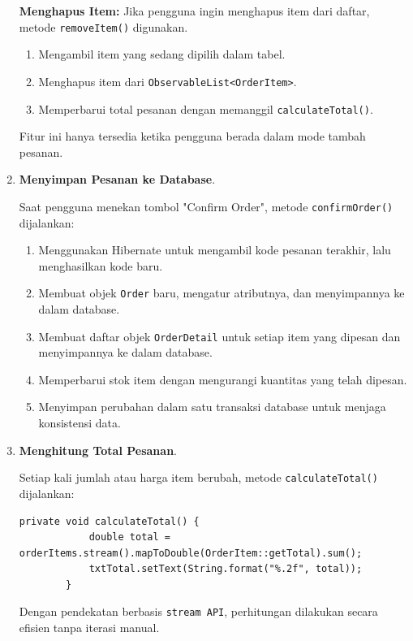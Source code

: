 \begin{enumerate}
	\textbf{Menghapus Item:}  
	Jika pengguna ingin menghapus item dari daftar, metode \texttt{removeItem()} digunakan.
	
	\begin{enumerate}
		\item Mengambil item yang sedang dipilih dalam tabel.
		\item Menghapus item dari \texttt{ObservableList<OrderItem>}.
		\item Memperbarui total pesanan dengan memanggil \texttt{calculateTotal()}.
	\end{enumerate}
	
	Fitur ini hanya tersedia ketika pengguna berada dalam mode tambah pesanan.
	
	\item \textbf{Menyimpan Pesanan ke Database}.
	
	Saat pengguna menekan tombol "Confirm Order", metode \texttt{confirmOrder()} dijalankan:
	
	\begin{enumerate}
		\item Menggunakan Hibernate untuk mengambil kode pesanan terakhir, lalu menghasilkan kode baru.
		\item Membuat objek \texttt{Order} baru, mengatur atributnya, dan menyimpannya ke dalam database.
		\item Membuat daftar objek \texttt{OrderDetail} untuk setiap item yang dipesan dan menyimpannya ke dalam database.
		\item Memperbarui stok item dengan mengurangi kuantitas yang telah dipesan.
		\item Menyimpan perubahan dalam satu transaksi database untuk menjaga konsistensi data.
	\end{enumerate}
	
	\item \textbf{Menghitung Total Pesanan}.
	
	Setiap kali jumlah atau harga item berubah, metode \texttt{calculateTotal()} dijalankan:
	
	\begin{lstlisting}[style=JavaStyle]
		private void calculateTotal() {
			double total = orderItems.stream().mapToDouble(OrderItem::getTotal).sum();
			txtTotal.setText(String.format("%.2f", total));
		}
	\end{lstlisting}
	
	Dengan pendekatan berbasis \texttt{stream API}, perhitungan dilakukan secara efisien tanpa iterasi manual.
	

\end{enumerate}
